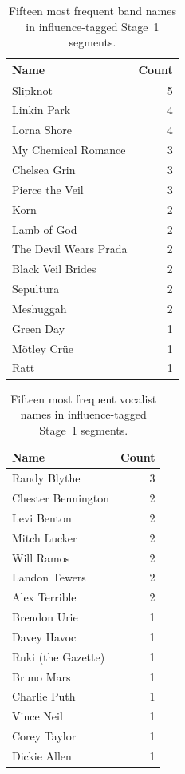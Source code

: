 \documentclass{article}
\begin{document}
\begin{table}[ht]
\centering
\caption{Fifteen most frequent band names in influence-tagged Stage~1 segments.}
\label{tab:topbands}
\begin{tabular}{lr}
\toprule
Name & Count \\
\midrule
Slipknot & 5 \\
Linkin Park & 4 \\
Lorna Shore & 4 \\
My Chemical Romance & 3 \\
Chelsea Grin & 3 \\
Pierce the Veil & 3 \\
Korn & 2 \\
Lamb of God & 2 \\
The Devil Wears Prada & 2 \\
Black Veil Brides & 2 \\
Sepultura & 2 \\
Meshuggah & 2 \\
Green Day & 1 \\
M\"{o}tley Cr\"{u}e & 1 \\
Ratt & 1 \\
\bottomrule
\end{tabular}
\end{table}

\begin{table}[ht]
\centering
\caption{Fifteen most frequent vocalist names in influence-tagged Stage~1 segments.}
\label{tab:topvox}
\begin{tabular}{lr}
\toprule
Name & Count \\
\midrule
Randy Blythe & 3 \\
Chester Bennington & 2 \\
Levi Benton & 2 \\
Mitch Lucker & 2 \\
Will Ramos & 2 \\
Landon Tewers & 2 \\
Alex Terrible & 2 \\
Brendon Urie & 1 \\
Davey Havoc & 1 \\
Ruki (the Gazette) & 1 \\
Bruno Mars & 1 \\
Charlie Puth & 1 \\
Vince Neil & 1 \\
Corey Taylor & 1 \\
Dickie Allen & 1 \\
\bottomrule
\end{tabular}
\end{table}
\end{document}
